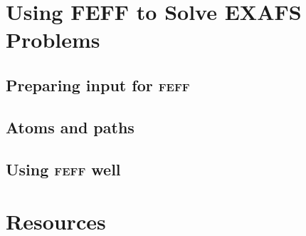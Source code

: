 \documentclass[10pt, xcolor=x11names, compress]{beamer}
\begin{document}


\section[EXAFS]{Using FEFF to Solve EXAFS Problems}
\subsection[\textsc{feff} input]{Preparing input for \textsc{feff}}

\subsection[Atoms and paths]{Atoms and paths}

\subsection[Good practice]{Using \textsc{feff} well}




\section[Resources]{Resources}
\end{document}
